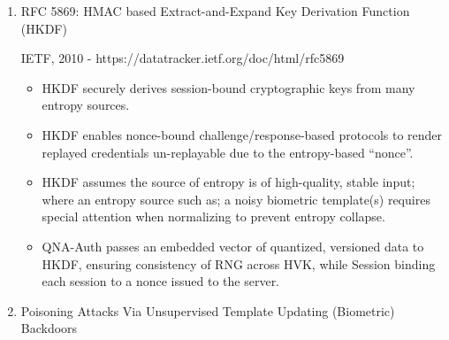 \begin{enumerate}
\begin{itemize}
\item The use of weighted score-level fusion with two CNN extracted Bio-metric modalities produces consistently lower error rates over existing single-modality baselines.
\item The feature's quality is enhanced through a Contrast Limited Adaptive Histogram Equalization (CLAHE) pre-processing step prior to fusion.
\item The weights on the input (features derived from different modalities) do not change from fixed values after training has been completed for adaptive means of re-weighting during inference for poorly functioning modalities; although there is no means to re-weight other than using weights that have been predetermined.
\item QNA-Auth uses a method of static constitutive weightings (e.g., camera = 0.7 \& microphone = 0.3) on those data points contained within the three confidence bands for both modalities allowing for graceful degradation if either of them are weakly concurrent with their given confidence bound.
\end{itemize}

\item RFC 5869: HMAC based Extract-and-Expand Key Derivation Function (HKDF)

IETF, 2010 - https://datatracker.ietf.org/doc/html/rfc5869

\begin{itemize}
\item HKDF securely derives session-bound cryptographic keys from many entropy sources.
\item HKDF enables nonce-bound challenge/response-based protocols to render replayed credentials un-replayable due to the entropy-based ``nonce''.
\item HKDF assumes the source of entropy is of high-quality, stable input; where an entropy source such as; a noisy biometric template(s) requires special attention when normalizing to prevent entropy collapse.
\item QNA-Auth passes an embedded vector of quantized, versioned data to HKDF, ensuring consistency of RNG across HVK, while Session binding each session to a nonce issued to the server.
\end{itemize}

\item Poisoning Attacks Via Unsupervised Template Updating (Biometric) Backdoors


\end{enumerate}
